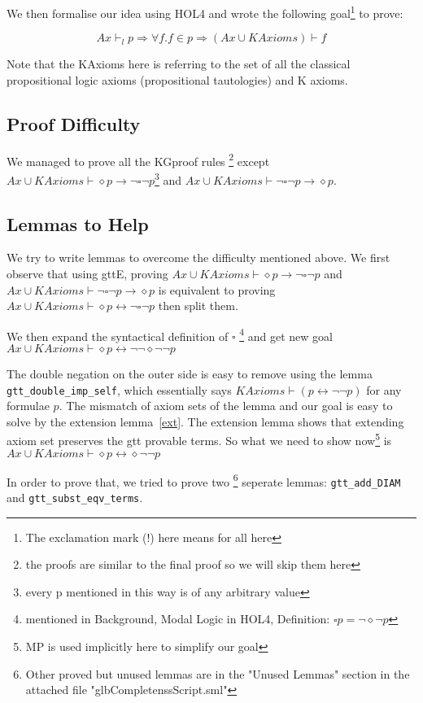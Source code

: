 \documentclass[submission,copyright,creativecommons]{eptcs}
\begin{document}
We then formalise our idea using HOL4 and wrote the following goal\footnote{The exclamation mark (!) here means for all here} to prove:


$$Ax \vdash_l p \Rightarrow \forall f. f \in p \Rightarrow (Ax\cup KAxioms) \vdash f$$

Note that the KAxioms here is referring to the set of all the classical propositional 
logic axioms (propositional tautologies) and K axioms. 

\subsection{Proof Difficulty}
\label{difficulty}
We managed to prove all the KGproof rules
\footnote{the proofs are similar to the final proof so we will skip them here} 
except $Ax \cup KAxioms \vdash \diamond p \rightarrow \neg \square \neg p$\footnote{every p mentioned 
in this way is of any arbitrary value} and 
$Ax \cup KAxioms \vdash \neg \square \neg p \rightarrow \diamond p$. 


\subsection{Lemmas to Help} 
We try to write lemmas to overcome the difficulty mentioned above.
We first observe that using gttE, proving $Ax \cup KAxioms \vdash \diamond p \rightarrow \neg \square \neg p$ and 
$Ax \cup KAxioms \vdash \neg \square \neg p \rightarrow \diamond p$ is equivalent to 
proving $Ax \cup KAxioms \vdash \diamond p \leftrightarrow \neg \square \neg p$ then split them.

We then expand the syntactical definition of $\square$ 
\footnote{mentioned in Background, Modal Logic in HOL4, Definition: $\square p = \neg \diamond \neg p $} and 
get new goal $Ax \cup KAxioms \vdash \diamond p \leftrightarrow \neg \neg \diamond \neg \neg p$ 

The double negation on the outer side is easy to remove using the lemma 
\texttt{gtt\_double\_imp\_self}, which essentially says $KAxioms \vdash (p \leftrightarrow \neg \neg p)$
for any formulae $p$. The mismatch of axiom sets of the lemma and our goal is easy 
to solve by the extension lemma~\ref{ext}. The 
extension lemma shows that extending axiom set preserves the gtt provable terms. So what we need to show now\footnote{MP is 
used implicitly here to simplify our goal} is 
$Ax \cup KAxioms \vdash \diamond p \leftrightarrow \diamond \neg \neg p$ 

In order to prove that, we tried to prove two
\footnote{Other proved but unused lemmas are in the "Unused Lemmas" section in the attached file "glbCompletenssScript.sml"} seperate lemmas: \texttt{gtt\_add\_DIAM}
and \texttt{gtt\_subst\_eqv\_terms}.
\end{document}
